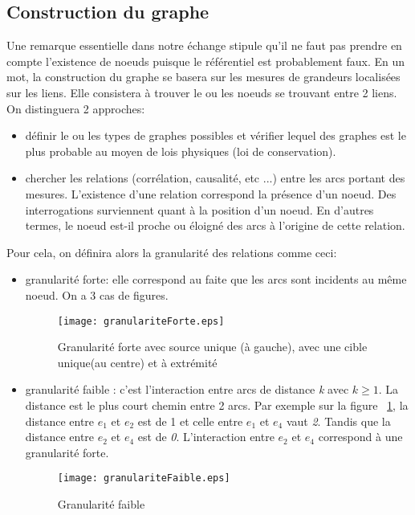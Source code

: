 \documentclass[onecolumn, 12pt]{article}
\begin{document}
\subsection{Construction du graphe}
Une remarque essentielle dans notre \'echange stipule qu'il ne faut pas prendre en compte l'existence de noeuds puisque le r\'ef\'erentiel est probablement faux. En un mot, la construction du graphe se basera sur les mesures de grandeurs localis\'ees sur les liens. Elle consistera \`a trouver le ou les noeuds se trouvant entre 2 liens. On distinguera 2 approches:
\begin{itemize}
\item d\'efinir le ou les types de graphes possibles et v\'erifier lequel des graphes est le plus probable au moyen de lois physiques (loi de conservation).
\item chercher les relations (corr\'elation, causalit\'e, etc ...) entre les arcs portant des mesures. L'existence d'une relation correspond la pr\'esence d'un noeud. Des interrogations surviennent quant \`a la position d'un noeud. En d'autres termes,  le noeud est-il proche ou \'eloign\'e des arcs \`a l'origine de cette relation. 
\end{itemize}
Pour cela, on d\'efinira alors la granularit\'e des relations comme ceci:
\begin{itemize}
\item granularit\'e forte: elle correspond au faite que les arcs sont incidents au m\^eme noeud. On a 3 cas de figures.\\
\begin{figure}[!h]
\texttt{[image: granulariteForte.eps]}
\caption{Granularit\'e forte avec source unique (\`a gauche), avec une cible unique(au centre) et \`a extr\'emit\'e}
\end{figure}

\item granularit\'e faible : c'est l'interaction entre arcs de distance \emph{k} avec $k \ge1$. La distance est le plus court chemin entre 2 arcs. Par exemple sur la figure ~\ref{granulariteFaible}, la distance entre $e_{1}$ et $e_{2}$ est de 1 et celle entre  $e_{1}$ et $e_{4}$ vaut \emph{2}. Tandis que la distance entre  $e_{2}$ et $e_{4}$ est de \emph{0}. L'interaction entre  $e_{2}$ et $e_{4}$ correspond \`a une granularit\'e forte.  

\begin{figure}
\texttt{[image: granulariteFaible.eps]}
\caption{Granularit\'e faible}
\label {granulariteFaible}
\end{figure}
\end{itemize}
\end{document}
